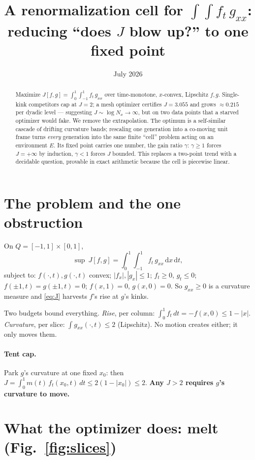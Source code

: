 \documentclass[11pt]{article}
\title{A renormalization cell for $\int\!\!\int f_t\,g_{xx}$:\\
reducing ``does $J$ blow up?'' to one fixed point}
\author{}
\date{July 2026}
\begin{document}
\maketitle

\begin{abstract}
Maximize $J[f,g]=\int_0^1\!\!\int_{-1}^1 f_t\,g_{xx}$ over time-monotone,
$x$-convex, Lipschitz $f,g$. Single-kink competitors cap at $J=2$; a mesh
optimizer certifies $J=3.055$ and grows $\approx0.215$ per dyadic level ---
suggesting $J\sim\log N_x\to\infty$, but on two data points that a starved
optimizer would fake. We remove the extrapolation. The optimum is a
self-similar cascade of drifting curvature bands; rescaling one generation
into a co-moving unit frame turns \emph{every} generation into the same
finite ``cell'' problem acting on an environment $E$. Its fixed point
carries one number, the gain ratio $\gamma$: $\gamma\ge1$ forces
$J=+\infty$ by induction, $\gamma<1$ forces $J$ bounded. This replaces a
two-point trend with a decidable question, provable in exact arithmetic
because the cell is piecewise linear.
\end{abstract}

\section{The problem and the one obstruction}

On $Q=[-1,1]\times[0,1]$,
\begin{equation}
\sup\ J[f,g]=\int_0^1\!\!\int_{-1}^1 f_t\,g_{xx}\,\mathrm{d}x\,\mathrm{d}t,
\label{eq:J}
\end{equation}
subject to: $f(\cdot,t),g(\cdot,t)$ convex; $|f_x|,|g_x|\le1$; $f_t\ge0$,
$g_t\le0$; $f(\pm1,t)=g(\pm1,t)=0$; $f(x,1)=0$, $g(x,0)=0$. So $g_{xx}\ge0$
is a curvature measure and \eqref{eq:J} harvests $f$'s rise at $g$'s kinks.

Two budgets bound everything. \emph{Rise}, per column: $\int_0^1 f_t\,dt
=-f(x,0)\le1-|x|$. \emph{Curvature}, per slice: $\int g_{xx}(\cdot,t)\le2$
(Lipschitz). No motion creates either; it only moves them.

\paragraph{Tent cap.} Park $g$'s curvature at one fixed $x_0$: then
$J=\int_0^1 m(t)\,f_t(x_0,t)\,dt\le2(1-|x_0|)\le2$. \textbf{Any $J>2$ requires
$g$'s curvature to move.}

\section{What the optimizer does: melt (Fig.~\ref{fig:slices})}
\end{document}
